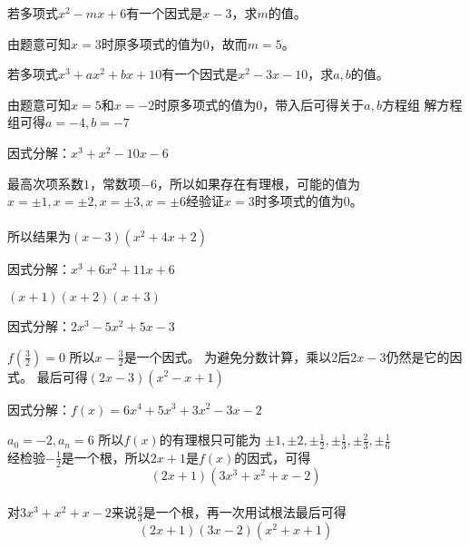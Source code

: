 \documentclass[windows,csize4]{BHCexam}
\begin{document}
\begin{groups}

    \begin{questions}[]
        \question[5] 若多项式$x^2-mx+6$有一个因式是$x-3$，求$m$的值。
        \begin{solution}{0.5cm}
            \methodonly 由题意可知$x=3$时原多项式的值为$0$，故而$m=5$。
        \end{solution}
        \vspace{3.5cm}

        \question[5] 若多项式$x^3+ax^2+bx+10$有一个因式是$x^2-3x-10$，求$a,b$的值。
        \begin{solution}{0.5cm}
            \methodonly 由题意可知$x=5$和$x=-2$时原多项式的值为$0$，带入后可得关于$a,b$方程组
            解方程组可得$a=-4,b=-7$
        \end{solution}
        \vspace{3.5cm}

        \question[5] 因式分解：$x^3+x^2-10x-6$
        \begin{solution}{0.5cm}
            \methodonly 最高次项系数$1$，常数项$-6$，所以如果存在有理根，可能的值为
            $x=\pm 1, x=\pm 2, x=\pm 3,x=\pm 6$经验证$x=3$时多项式的值为$0$。\\
             \\
            所以结果为$(x-3)(x^2+4x+2)$
        \end{solution}
        \vspace{3.5cm}

        \question[5] 因式分解：$x^3+6x^2+11x+6$
        \begin{solution}{0.5cm}
            \methodonly $(x+1)(x+2)(x+3)$
        \end{solution}
        \vspace{3.5cm}

        \question[5] 因式分解：$2x^3-5x^2+5x-3$
        \begin{solution}{0.5cm}
            \methodonly $f(\frac{3}{2})=0$ 所以$x-\frac{3}{2}$是一个因式。
            为避免分数计算，乘以$2$后$2x-3$仍然是它的因式。
            最后可得$(2x-3)(x^2-x+1)$
        \end{solution}
        \vspace{3.5cm}

        \question[5] 因式分解：$f(x)=6x^4+5x^3+3x^2-3x-2$
        \begin{solution}{0.5cm}
            \methodonly $a_0=-2, a_n=6$ 所以$f(x)$的有理根只可能为
            $\pm 1, \pm 2, \pm \frac{1}{2}, \pm \frac{1}{3}, \pm \frac{2}{3}, \pm \frac{1}{6}$ \\
            经检验$-\frac{1}{2}$是一个根，所以$2x+1$是$f(x)$的因式，可得 \\
            \[(2x+1)(3x^3+x^2+x-2)\] \\
            对$3x^3+x^2+x-2$来说$\frac{2}{3}$是一个根，再一次用试根法最后可得 \\
            \[(2x+1)(3x-2)(x^2+x+1)\]
        \end{solution}
        \vspace{3.5cm}


\end{questions}
\end{groups}
\end{document}
